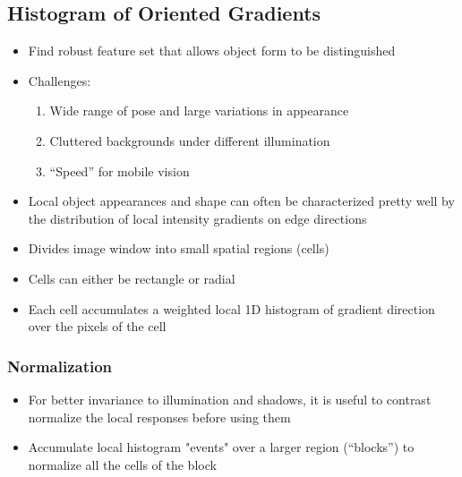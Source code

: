 \documentclass[letterpaper,12pt]{article}
\begin{document}
\subsection{Histogram of Oriented Gradients}
\begin{itemize}
 \item Find robust feature set that allows object form to be distinguished
 \item Challenges:
       \begin{enumerate}
        \item Wide range of pose and large variations in appearance
        \item Cluttered backgrounds under different illumination
        \item ``Speed'' for mobile vision
       \end{enumerate}
 \item Local object appearances and shape can often be characterized pretty well by the distribution of local intensity gradients on edge directions
 \item Divides image window into small spatial regions (cells)
 \item Cells can either be rectangle or radial
 \item Each cell accumulates a weighted local 1D histogram of gradient direction over the pixels of the cell
\end{itemize}

\subsubsection{Normalization}
\begin{itemize}
 \item For better invariance to illumination and shadows, it is useful to contrast normalize the local responses before using them
 \item Accumulate local histogram "events" over a larger region (``blocks'') to normalize all the cells of the block
\end{itemize}
\end{document}
